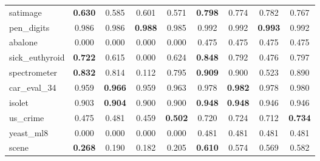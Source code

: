 \begin{figure}[ht]
\begin{tabular}{p{22mm}|*4{p{14mm}}|*4{p{14mm}}}
        satimage&\multicolumn{1}{c}{\textbf{0.630}}&\multicolumn{1}{c}{0.585}&\multicolumn{1}{c}{0.601}&\multicolumn{1}{c|}{0.571}&\multicolumn{1}{c}{\textbf{0.798}}&\multicolumn{1}{c}{0.774}&\multicolumn{1}{c}{0.782}&\multicolumn{1}{c}{0.767}\\
        pen\_digits&\multicolumn{1}{c}{0.986}&\multicolumn{1}{c}{0.986}&\multicolumn{1}{c}{\textbf{0.988}}&\multicolumn{1}{c|}{0.985}&\multicolumn{1}{c}{0.992}&\multicolumn{1}{c}{0.992}&\multicolumn{1}{c}{\textbf{0.993}}&\multicolumn{1}{c}{0.992}\\
        abalone&\multicolumn{1}{c}{0.000}&\multicolumn{1}{c}{0.000}&\multicolumn{1}{c}{0.000}&\multicolumn{1}{c|}{0.000}&\multicolumn{1}{c}{0.475}&\multicolumn{1}{c}{0.475}&\multicolumn{1}{c}{0.475}&\multicolumn{1}{c}{0.475}\\
        sick\_euthyroid&\multicolumn{1}{c}{\textbf{0.722}}&\multicolumn{1}{c}{0.615}&\multicolumn{1}{c}{0.000}&\multicolumn{1}{c|}{0.624}&\multicolumn{1}{c}{\textbf{0.848}}&\multicolumn{1}{c}{0.792}&\multicolumn{1}{c}{0.476}&\multicolumn{1}{c}{0.797}\\
        spectrometer&\multicolumn{1}{c}{\textbf{0.832}}&\multicolumn{1}{c}{0.814}&\multicolumn{1}{c}{0.112}&\multicolumn{1}{c|}{0.795}&\multicolumn{1}{c}{\textbf{0.909}}&\multicolumn{1}{c}{0.900}&\multicolumn{1}{c}{0.523}&\multicolumn{1}{c}{0.890}\\
        car\_eval\_34&\multicolumn{1}{c}{0.959}&\multicolumn{1}{c}{\textbf{0.966}}&\multicolumn{1}{c}{0.959}&\multicolumn{1}{c|}{0.963}&\multicolumn{1}{c}{0.978}&\multicolumn{1}{c}{\textbf{0.982}}&\multicolumn{1}{c}{0.978}&\multicolumn{1}{c}{0.980}\\
        isolet&\multicolumn{1}{c}{0.903}&\multicolumn{1}{c}{\textbf{0.904}}&\multicolumn{1}{c}{0.900}&\multicolumn{1}{c|}{0.900}&\multicolumn{1}{c}{\textbf{0.948}}&\multicolumn{1}{c}{\textbf{0.948}}&\multicolumn{1}{c}{0.946}&\multicolumn{1}{c}{0.946}\\
        us\_crime&\multicolumn{1}{c}{0.475}&\multicolumn{1}{c}{0.481}&\multicolumn{1}{c}{0.459}&\multicolumn{1}{c|}{\textbf{0.502}}&\multicolumn{1}{c}{0.720}&\multicolumn{1}{c}{0.724}&\multicolumn{1}{c}{0.712}&\multicolumn{1}{c}{\textbf{0.734}}\\
        yeast\_ml8&\multicolumn{1}{c}{0.000}&\multicolumn{1}{c}{0.000}&\multicolumn{1}{c}{0.000}&\multicolumn{1}{c|}{0.000}&\multicolumn{1}{c}{0.481}&\multicolumn{1}{c}{0.481}&\multicolumn{1}{c}{0.481}&\multicolumn{1}{c}{0.481}\\
        scene&\multicolumn{1}{c}{\textbf{0.268}}&\multicolumn{1}{c}{0.190}&\multicolumn{1}{c}{0.182}&\multicolumn{1}{c|}{0.205}&\multicolumn{1}{c}{\textbf{0.610}}&\multicolumn{1}{c}{0.574}&\multicolumn{1}{c}{0.569}&\multicolumn{1}{c}{0.582}\\

\end{tabular}
\end{figure}
